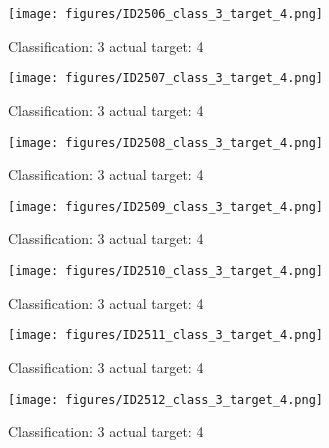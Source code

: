 \begin{figure}[h!]
\begin{center}
\texttt{[image: figures/ID2506\_class\_3\_target\_4.png]}
\end{center}
\caption{ Classification: 3 actual target: 4}
\label{fig:ID2506_class_3_target_4}
\end{figure}
\begin{figure}[h!]
\begin{center}
\texttt{[image: figures/ID2507\_class\_3\_target\_4.png]}
\end{center}
\caption{ Classification: 3 actual target: 4}
\label{fig:ID2507_class_3_target_4}
\end{figure}
\begin{figure}[h!]
\begin{center}
\texttt{[image: figures/ID2508\_class\_3\_target\_4.png]}
\end{center}
\caption{ Classification: 3 actual target: 4}
\label{fig:ID2508_class_3_target_4}
\end{figure}
\begin{figure}[h!]
\begin{center}
\texttt{[image: figures/ID2509\_class\_3\_target\_4.png]}
\end{center}
\caption{ Classification: 3 actual target: 4}
\label{fig:ID2509_class_3_target_4}
\end{figure}
\begin{figure}[h!]
\begin{center}
\texttt{[image: figures/ID2510\_class\_3\_target\_4.png]}
\end{center}
\caption{ Classification: 3 actual target: 4}
\label{fig:ID2510_class_3_target_4}
\end{figure}
\begin{figure}[h!]
\begin{center}
\texttt{[image: figures/ID2511\_class\_3\_target\_4.png]}
\end{center}
\caption{ Classification: 3 actual target: 4}
\label{fig:ID2511_class_3_target_4}
\end{figure}
\begin{figure}[h!]
\begin{center}
\texttt{[image: figures/ID2512\_class\_3\_target\_4.png]}
\end{center}
\caption{ Classification: 3 actual target: 4}
\label{fig:ID2512_class_3_target_4}
\end{figure}
